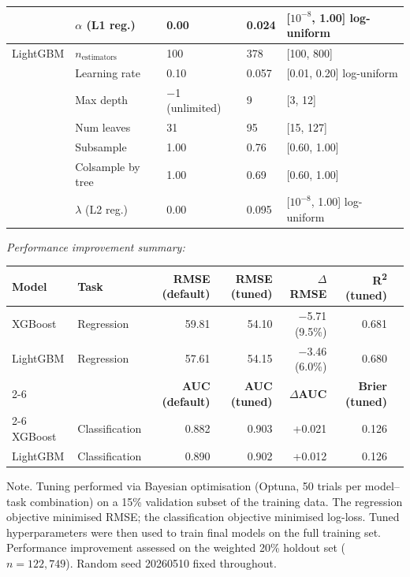 \begin{table}[tb]
\begin{tabular}{@{}lllll@{}}
 & $\alpha$ (L1 reg.) & 0.00 & 0.024 & [$10^{-8}$, 1.00] log-uniform \\
\midrule
LightGBM & $n_{\text{estimators}}$ & 100 & 378 & [100, 800] \\
 & Learning rate & 0.10 & 0.057 & [0.01, 0.20] log-uniform \\
 & Max depth & $-$1 (unlimited) & 9 & [3, 12] \\
 & Num leaves & 31 & 95 & [15, 127] \\
 & Subsample & 1.00 & 0.76 & [0.60, 1.00] \\
 & Colsample by tree & 1.00 & 0.69 & [0.60, 1.00] \\
 & $\lambda$ (L2 reg.) & 0.00 & 0.095 & [$10^{-8}$, 1.00] log-uniform \\
\bottomrule
\end{tabular}

\par\small\textit{Performance improvement summary:}

\begin{tabular}{@{}llrrrrr@{}}
\toprule
\textbf{Model} & \textbf{Task} & \textbf{RMSE (default)} & \textbf{RMSE (tuned)} & \textbf{$\Delta$RMSE} & \textbf{R\textsuperscript{2} (tuned)} \\
\midrule
XGBoost & Regression & 59.81 & 54.10 & $-$5.71 (9.5\%) & 0.681 \\
LightGBM & Regression & 57.61 & 54.15 & $-$3.46 (6.0\%) & 0.680 \\
\cmidrule{2-6}
 &  & \textbf{AUC (default)} & \textbf{AUC (tuned)} & \textbf{$\Delta$AUC} & \textbf{Brier (tuned)} \\
\cmidrule{2-6}
XGBoost & Classification & 0.882 & 0.903 & +0.021 & 0.126 \\
LightGBM & Classification & 0.890 & 0.902 & +0.012 & 0.126 \\
\bottomrule
\end{tabular}

\begin{tablenotes}
\item Note. Tuning performed via Bayesian optimisation (Optuna, 50 trials per model--task combination) on a 15\% validation subset of the training data. The regression objective minimised RMSE; the classification objective minimised log-loss. Tuned hyperparameters were then used to train final models on the full training set. Performance improvement assessed on the weighted 20\% holdout set ($n = 122{,}749$). Random seed 20260510 fixed throughout.
\end{tablenotes}
\end{table}

